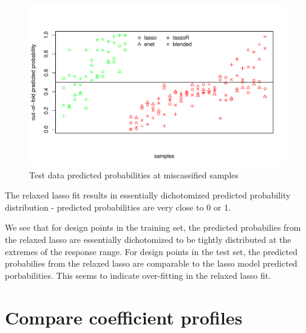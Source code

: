 \documentclass[
]{book}
\begin{document}
\begin{figure}
\centering
\includegraphics{Static/figures/misclassTest-1.pdf}
\caption{\label{fig:misclassTest}Test data predicted probabilities at miscassified samples}
\end{figure}

The relaxed lasso fit results in essentially dichotomized predicted probability
distribution - predicted probabilities are very close to 0 or 1.

We see that for design points in the training set, the predicted probabilies from the relaxed lasso
are essentially dichotomized to be tightly distributed at the extremes of the
response range. For design points in the test set, the predicted probabilies from the relaxed lasso
are comparable to the lasso model predicted porbabilities. This seems to indicate over-fitting
in the relaxed lasso fit.

\hypertarget{compare-coefficient-profiles}{%
\section{Compare coefficient profiles}\label{compare-coefficient-profiles}}
\end{document}
